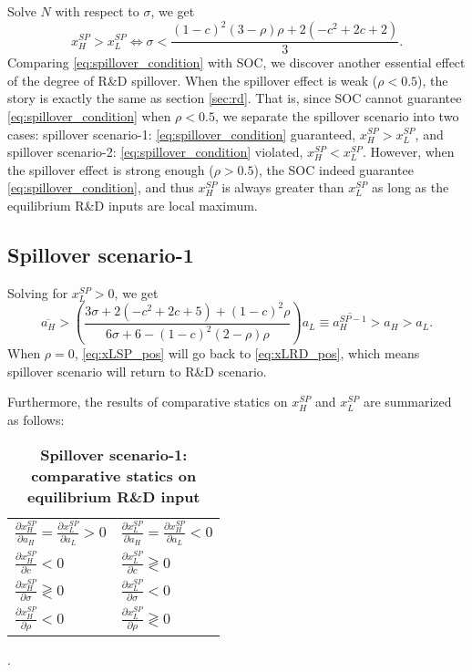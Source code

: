\documentclass[12pt]{article}
\begin{document}
Solve $N$ with respect to $\sigma$, we get 
\begin{equation}
  x_H^{SP} > x_L^{SP} \iff \sigma < \frac{(1 - c)^2  (3 - \rho) \rho + 2 (- c^2 + 2 c + 2)}{3}. 
    \label{eq:spillover_condition}
    \tag{C5}
\end{equation}
Comparing \eqref{eq:spillover_condition} with SOC, we discover another essential effect of the degree of R\&D spillover.
When the spillover effect is weak ($\rho < 0.5$), the story is exactly the same as section \ref{sec:rd}.
That is, since SOC cannot guarantee \eqref{eq:spillover_condition} when $\rho < 0.5$, we separate the spillover scenario into two cases: spillover scenario-1: \eqref{eq:spillover_condition} guaranteed, $x_H^{SP} > x_L^{SP}$, and spillover scenario-2: \eqref{eq:spillover_condition} violated, $x_H^{SP} < x_L^{SP}$.
However, when the spillover effect is strong enough ($\rho > 0.5$), the SOC indeed guarantee \eqref{eq:spillover_condition}, and thus $x_H^{SP}$ is always greater than $x_L^{SP}$ as long as the equilibrium R\&D inputs are local maximum.

\subsection{Spillover scenario-1}
\label{sec:spillover_1}

Solving for $x_L^{SP} > 0$, we get
\begin{equation}
  \overline{a_H} > \left( \frac{3 \sigma + 2 (- c^2 + 2 c + 5) + (1 - c)^2 \rho}{6 \sigma + 6 - (1 - c)^2  (2 - \rho) \rho} \right) a_L \equiv \overline{a_H^{SP-1}} > a_H > a_L.
    \label{eq:xLSP_pos}
    \tag{C6}
\end{equation}
When $\rho = 0$, \eqref{eq:xLSP_pos} will go back to \eqref{eq:xLRD_pos}, which means spillover scenario will return to R\&D scenario.

Furthermore, the results of comparative statics on $x_H^{SP}$ and $x_L^{SP}$ are summarized as follows:
\begin{table}[h]
    \caption{\textbf{Spillover scenario-1: comparative statics on equilibrium R\&D input}}
    \label{tab:spillover_com}
    \begin{center}
    \begin{tabular}{ll}
        $\frac{\partial x_H^{SP}}{\partial a_H} = \frac{\partial x_L^{SP}}{\partial a_L} > 0$ & $\frac{\partial x_L^{SP}}{\partial a_H} = \frac{\partial x_H^{SP}}{\partial a_L} < 0$ \\
        $\frac{\partial x_H^{SP}}{\partial c} < 0$ & $\frac{\partial x_L^{SP}}{\partial c} \gtrless 0$ \\
        $\frac{\partial x_H^{SP}}{\partial \sigma} \gtrless 0$ & $\frac{\partial x_L^{SP}}{\partial \sigma} < 0$ \\
        $\frac{\partial x_H^{SP}}{\partial \rho} < 0$ & $\frac{\partial x_L^{SP}}{\partial \rho} \gtrless 0$ \\
    \end{tabular}.
    \end{center}
\end{table}
\end{document}
